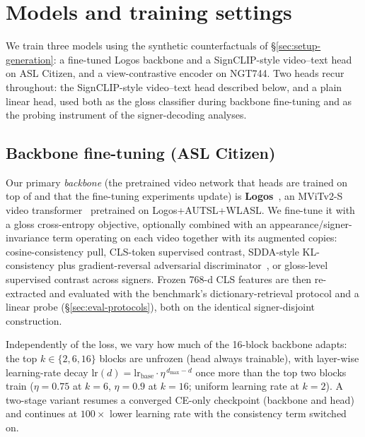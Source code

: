 \section{Models and training settings}
\label{sec:setup-training}
We train three models using the synthetic counterfactuals of
\S\ref{sec:setup-generation}: a fine-tuned Logos backbone and a
SignCLIP-style video--text head on ASL Citizen, and a view-contrastive
encoder on NGT744. Two heads recur throughout: the SignCLIP-style
video--text head described below, and a plain linear head, used both as
the gloss classifier during backbone fine-tuning and as the probing
instrument of the signer-decoding analyses.

\subsection{Backbone fine-tuning (ASL Citizen)}
Our primary \emph{backbone} (the pretrained video network that heads
are trained on top of and that the fine-tuning experiments update) is
\textbf{Logos}~\cite{ovodovLogosWellTemperedPretrain2025}, an MViTv2-S
video transformer~\cite{liMViTv2ImprovedMultiscale2022} pretrained on
Logos+AUTSL+WLASL. We fine-tune it with a gloss cross-entropy objective,
optionally combined with an appearance/signer-invariance term operating
on each video together with its augmented copies: cosine-consistency
pull, CLS-token supervised contrast, SDDA-style KL-consistency plus
gradient-reversal adversarial
discriminator~\cite{fuSignerDiversitydrivenData2024b}, or gloss-level
supervised contrast across signers. Frozen 768-d CLS features are then
re-extracted and evaluated with the benchmark's dictionary-retrieval
protocol and a linear probe (\S\ref{sec:eval-protocols}), both on the
identical signer-disjoint construction.

Independently of the loss, we vary how much of the 16-block backbone
adapts: the top $k \in \{2, 6, 16\}$ blocks are unfrozen (head always
trainable), with layer-wise learning-rate decay
$\mathrm{lr}(d) = \mathrm{lr}_{\mathrm{base}} \cdot \eta^{\,d_{\max}-d}$
once more than the top two blocks train ($\eta = 0.75$ at $k{=}6$,
$\eta = 0.9$ at $k{=}16$; uniform learning rate at $k{=}2$). A two-stage
variant resumes a
converged CE-only checkpoint (backbone and head) and continues at
$100\times$ lower learning rate with the consistency term switched on.

